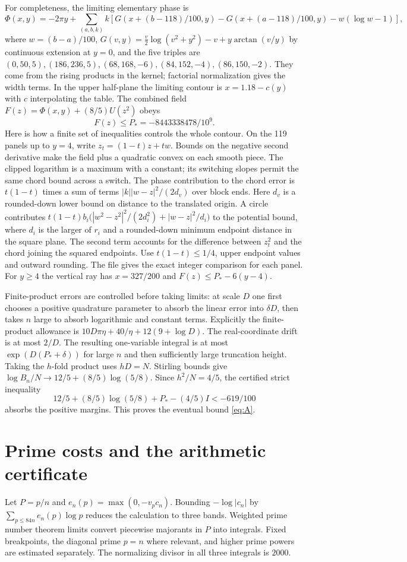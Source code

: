 \documentclass[11pt]{article}
\newcommand{\val}{v_p}
\newcommand{\code}[1]{\texttt{\detokenize{#1}}}
\begin{document}
For completeness, the limiting elementary phase is
\[
 \Phi(x,y)=-2\pi y+\sum_{(a,b,k)} k\left[
 G(x+(b-118)/100,y)-G(x+(a-118)/100,y)-w(\log w-1)\right],
\]
where $w=(b-a)/100$, $G(v,y)=\tfrac v2\log(v^2+y^2)-v+
y\arctan(v/y)$ by continuous extension at $y=0$, and the five triples are
$(0,50,5),(186,236,5),(68,168,-6),(84,152,-4),(86,150,-2)$.
They come from the rising products in the kernel; factorial
normalization gives the width terms. In the upper half-plane the limiting
contour is $x=1.18-c(y)$ with $c$ interpolating the table. The combined
field $F(z)=\Phi(x,y)+(8/5)U(z^2)$ obeys
\[
 F(z)\le P_*=-8443338478/10^9.
\]
Here is how a finite set of inequalities controls the whole contour.
On the 119 panels up to $y=4$, write $z_t=(1-t)z+tw$. Bounds on the
negative second derivative make the field plus a quadratic convex
on each smooth piece. The clipped logarithm is a maximum with a constant;
its switching slopes permit the same chord bound across a switch.
The phase contribution to the chord error is $t(1-t)$ times a sum of
terms $|k||w-z|^2/(2d_v)$ over block ends. Here $d_v$ is a rounded-down
lower bound on distance to the translated origin. A circle contributes
$t(1-t)b_i\big(|w^2-z^2|^2/(2d_i^2)+|w-z|^2/d_i\big)$ to the potential
bound, where $d_i$ is the larger of $r_i$ and a rounded-down minimum
endpoint distance in the square plane. The second term accounts for the
difference between $z_t^2$ and the chord joining the squared endpoints.
Use $t(1-t)\le1/4$, upper endpoint values and outward rounding. The file
\code{ChordBudget.lean} gives the exact integer comparison for each panel.
For $y\ge4$ the vertical ray has $x=327/200$ and
$F(z)\le P_*-6(y-4)$.

Finite-product errors are controlled before taking limits: at scale $D$
one first chooses a positive quadrature parameter to absorb the linear
error into $\delta D$, then takes $n$ large to absorb logarithmic and
constant terms. Explicitly the finite-product allowance is $10D\pi\eta+40/\eta+12(9+\log D)$. The real-coordinate drift is at most $2/D$. The resulting
one-variable integral is at most $\exp(D(P_*+\delta))$ for large $n$
and then sufficiently large truncation height. Taking the $h$-fold
product uses $hD=N$. Stirling bounds give
$\log B_n/N\to 12/5+(8/5)\log(5/8)$. Since $h^2/N=4/5$, the certified
strict inequality
\[
 12/5+(8/5)\log(5/8)+P_*-(4/5)I<-619/100
\]
absorbs the positive margins. This proves the eventual bound \eqref{eq:A}.

\section{Prime costs and the arithmetic certificate}
Let $P=p/n$ and $e_n(p)=\max(0,-\val c_n)$. Bounding
$-\log|c_n|$ by $\sum_{p\le84n} e_n(p)\log p$ reduces the calculation to
three bands. Weighted prime number theorem limits convert piecewise
majorants in $P$ into integrals. Fixed breakpoints, the diagonal prime
$p=n$ where relevant, and higher prime powers are estimated separately.
The normalizing divisor in all three integrals is $2000$.
\end{document}
